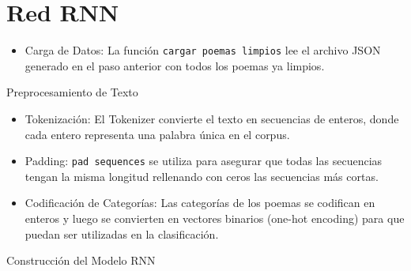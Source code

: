 \section{Red RNN}

\begin{itemize}
    \item Carga de Datos: La función \texttt{cargar poemas limpios} lee el archivo JSON
    generado en el paso anterior con todos los poemas ya limpios.    
\end{itemize}

\begin{center}
    Preprocesamiento de Texto
\end{center}

\begin{itemize}
    \item Tokenización: El Tokenizer convierte el texto en secuencias de enteros, donde 
    cada entero representa una palabra única en el corpus.

    \item Padding: \texttt{pad sequences} se utiliza para asegurar que todas las secuencias 
    tengan la misma longitud rellenando con ceros las secuencias más cortas.

    \item Codificación de Categorías: Las categorías de los poemas se codifican en 
    enteros y luego se convierten en vectores binarios (one-hot encoding) para que 
    puedan ser utilizadas en la clasificación.
\end{itemize}

\begin{center}
    Construcción del Modelo RNN
\end{center}


